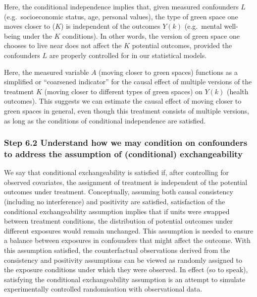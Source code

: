 \documentclass[
  singlecolumn]{article}
\begin{document}
Here, the conditional independence implies that, given measured
confounders \(L\) (e.g.~socioeconomic status, age, personal values), the
type of green space one moves closer to (\(K\)) is independent of the
outcomes \(Y(k)\) (e.g.~mental well-being under the \(K\) conditions).
In other words, the version of green space one chooses to live near does
not affect the \(K\) potential outcomes, provided the confounders \(L\)
are properly controlled for in our statistical models.

Here, the measured variable \(A\) (moving closer to green spaces)
functions as a simplified or ``coarsened indicator'' for the causal
effect of multiple versions of the treatment \(K\) (moving closer to
different types of green spaces) on \(Y(k)\) (health outcomes). This
suggests we can estimate the causal effect of moving closer to green
spaces in general, even though this treatment consists of multiple
versions, as long as the conditions of conditional independence are
satisfied.

\subsubsection{\texorpdfstring{\textbf{Step 6.2 Understand how we may
condition on confounders to address the assumption of (conditional)
exchangeability}}{Step 6.2 Understand how we may condition on confounders to address the assumption of (conditional) exchangeability}}\label{step-6.2-understand-how-we-may-condition-on-confounders-to-address-the-assumption-of-conditional-exchangeability}

We say that conditional exchangeability is satisfied if, after
controlling for observed covariates, the assignment of treatment is
independent of the potential outcomes under treatment. Conceptually,
assuming both causal consistency (including no interference) and
positivity are satisfied, satisfaction of the conditional
exchangeability assumption implies that if units were swapped between
treatment conditions, the distribution of potential outcomes under
different exposures would remain unchanged. This assumption is needed to
ensure a balance between exposures in confounders that might affect the
outcome. With this assumption satisfied, the counterfactual observations
derived from the consistency and positivity assumptions can be viewed as
randomly assigned to the exposure conditions under which they were
observed. In effect (so to speak), satisfying the conditional
exchangeability assumption is an attempt to simulate experimentally
controlled randomisation with observational data.
\end{document}
